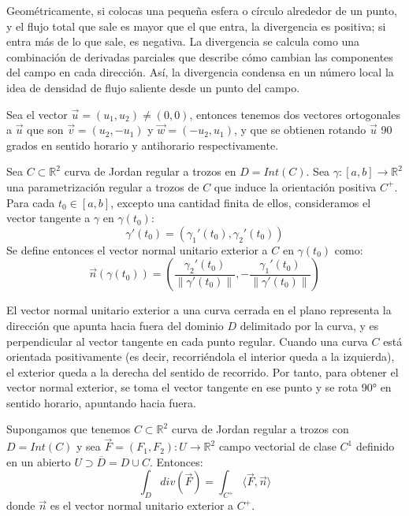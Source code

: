 Geométricamente, si colocas una pequeña esfera o círculo alrededor de un punto,
y el flujo total que sale es mayor que el que entra, la divergencia es
positiva; si entra más de lo que sale, es negativa. La divergencia se calcula
como una combinación de derivadas parciales que describe cómo cambian las
componentes del campo en cada dirección. Así, la divergencia condensa en un
número local la idea de densidad de flujo saliente desde un punto del campo.\\

\begin{observación}
Sea el vector $\vec{u} = (u_1, u_2) \neq (0,0)$, entonces tenemos dos vectores ortogonales a $\vec{u}$ que son $\vec{v} = (u_2, -u_1)$ y $\vec{w} = (-u_2, u_1)$, y que se obtienen rotando $\vec{u}$ 90 grados en sentido horario y antihorario respectivamente.
\end{observación}

\begin{definición} 
Sea $C \subset \mathbb{R}^2$ curva de Jordan regular a trozos en $D = Int(C)$. Sea $\gamma : [a,b] \to \mathbb{R}^2$ una parametrización regular a trozos de $C$ que induce la orientación positiva $C^+$. Para cada $t_0 \in [a,b]$, excepto una cantidad finita de ellos, consideramos el vector tangente a $\gamma$ en $\gamma(t_0)$:
$$\gamma'(t_0) = (\gamma_1'(t_0), \gamma_2'(t_0))$$
Se define entonces el vector normal unitario exterior a $C$ en $\gamma(t_0)$ como:
$$\vec{n}(\gamma(t_0)) = \left(\frac{\gamma_2'(t_0)}{\lVert \gamma'(t_0) \rVert}, -\frac{\gamma_1'(t_0)}{\lVert \gamma'(t_0) \rVert}\right)$$
\end{definición}

El vector normal unitario exterior a una curva cerrada en el plano representa
la dirección que apunta hacia fuera del dominio $D$ delimitado por la curva, y
es perpendicular al vector tangente en cada punto regular. Cuando una curva $C$
está orientada positivamente (es decir, recorriéndola el interior queda a la
izquierda), el exterior queda a la derecha del sentido de recorrido. Por tanto,
para obtener el vector normal exterior, se toma el vector tangente en ese punto
y se rota 90° en sentido horario, apuntando hacia fuera.\\

\begin{teorema} 
    Supongamos que tenemos $C \subset \mathbb{R}^2$ curva de Jordan regular a trozos con $D = Int(C)$ y sea $\vec{F} = (F_1, F_2) : U \to \mathbb{R}^2$ campo vectorial de clase $C^1$ definido en un abierto $U \supset \overline{D} = D \cup C$. Entonces:
    $$\int_{D} div(\vec{F}) = \int_{C^+} \langle \vec{F}, \vec{n} \rangle$$
    donde $\vec{n}$ es el vector normal unitario exterior a $C^+$.
\end{teorema}

